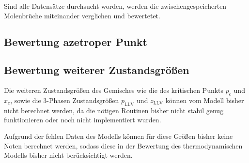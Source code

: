 \documentclass[../thesis.tex]{subfiles}
\begin{document}
Sind alle Datensätze durchsucht worden, werden die zwischengespeicherten Molenbrüche miteinander verglichen und bewertetet.

\subsection{Bewertung azetroper Punkt} 


\subsection{Bewertung weiterer Zustandsgrößen}

Die weiteren Zustandsgrößen des Gemisches wie die des kritischen Punkts $ p_{\mathrm{c}}$ und $ x_{\mathrm{c}}$, sowie die 3-Phasen Zustandsgrößen $p_{\mathrm{LLV}}$ und $z_{\mathrm{LLV}}$ können vom Modell bisher nicht berechnet werden, da die nötigen Routinen bisher nicht stabil genug funktionieren oder noch nicht implementiert wurden.

Aufgrund der fehlen Daten des Modells können für diese Größen bisher keine Noten berechnet werden, sodass diese in der Bewertung des thermodynamischen Modells bisher nicht berücksichtigt werden.
\end{document}

